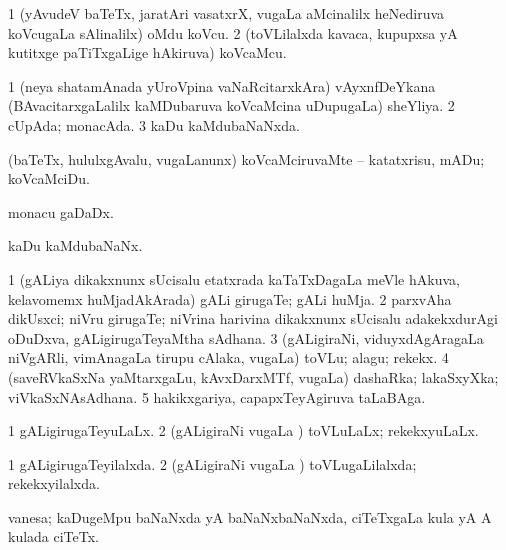 \bentry
{} 
\gl{\nA}
\expl{}
\bmng
\bnum
\num{1} (yAvudeV baTeTx, jaratAri vasatxrX, \mo vugaLa aMcinalilx heNediruva koVcugaLa sAlinalilx) oMdu koVcu. 
\num{2} (toVLilalxda kavaca, kupupxsa yA kutitxge paTiTxgaLige hAkiruva) koVcaMcu. 
\enum
\emng
\eentry

\bentry
{} 
\gl{\gu}
\expl{}
\bmng
\bnum
\num{1} (neya shatamAnada yUroVpina vaNaRcitarxkAra) vAyxnfDeYkana (BAvacitarxgaLalilx kaMDubaruva koVcaMcina uDupugaLa) sheYliya. 
\num{2} cUpAda; monacAda. 
\num{3} kaDu kaMdubaNaNxda. 
\enum
\emng
\eentry

\bentry
{} 
\gl{\sakirx}
\expl{}
\bmng
 (baTeTx, hululxgAvalu, \mo vugaLanunx) koVcaMciruvaMte -- katatxrisu, mADu; koVcaMciDu. 
\emng
\eentry

\bentry
{}
\gl{\nA}
\bmng
monacu gaDaDx.  
\emng
\eentry

\bentry
{}
\gl{\nA}
\expl{}
\bmng
kaDu kaMdubaNaNx. 
\emng
\eentry

\bentry
{} 
\gl{\nA}
\expl{}
\bmng
\bnum
\num{1} (gALiya dikakxnunx sUcisalu etatxrada kaTaTxDagaLa meVle hAkuva, kelavomemx huMjadAkArada) gALi girugaTe; gALi huMja. 
\num{2} parxvAha dikUsxci; niVru girugaTe; niVrina harivina dikakxnunx sUcisalu adakekxdurAgi oDuDxva, gALigirugaTeyaMtha sAdhana. 
\num{3} (gALigiraNi, viduyxdAgAragaLa niVgARli, vimAnagaLa tirupu cAlaka, \mo vugaLa) toVLu; alagu; rekekx. 
\num{4} (saveRVkaSxNa yaMtarxgaLu, kAvxDarxMTf, \mo vugaLa) dashaRka; lakaSxyXka; viVkaSxNAsAdhana. 
\num{5} hakikxgariya, capapxTeyAgiruva taLaBAga. 
\enum
\emng
\eentry

\bentry 
{} 
\gl{\gu}
\expl{}
\bmng
\bnum
\num{1} gALigirugaTeyuLaLx. 
\num{2} (gALigiraNi \mo vugaLa \vi) toVLuLaLx; rekekxyuLaLx. 
\enum
\emng
\eentry

\bentry
{} 
\gl{\gu}
\expl{}
\bmng
\bnum
\num{1} gALigirugaTeyilalxda. 
\num{2} (gALigiraNi \mo vugaLa \vi) toVLugaLilalxda; rekekxyilalxda. 
\enum
\emng
\eentry

\bentry
{} 
\gl{\nA}
\expl{}
\bmng
 vanesa; kaDugeMpu baNaNxda yA baNaNxbaNaNxda, ciTeTxgaLa kula yA A kulada ciTeTx. 
\emng
\eentry

